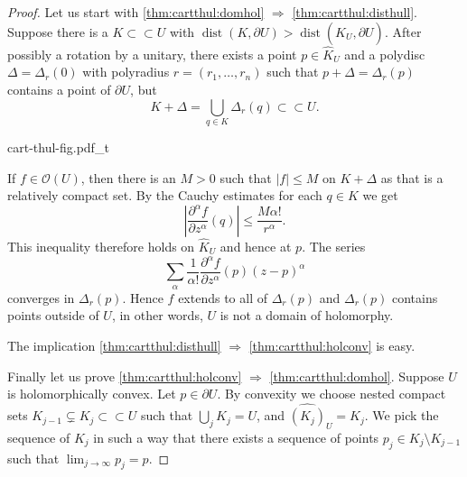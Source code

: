 \documentclass[12pt,openany]{book}
\newcommand{\sabs}[1]{\lvert {#1} \rvert}
\newcommand{\abs}[1]{\left\lvert {#1} \right\rvert}
\newcommand{\sO}{{\mathscr{O}}}
\theoremstyle{plain}
\theoremstyle{remark}
\theoremstyle{definition}
\theoremstyle{exercise}
\theoremstyle{example}
\begin{document}
\begin{proof}
Let us start with \eqref{thm:cartthul:domhol} $\Rightarrow$
\eqref{thm:cartthul:disthull}.  Suppose there is a $K \subset
\subset U$ with $\operatorname{dist}(K,\partial U) > \operatorname{dist}(\widehat{K}_U,\partial U)$.
After possibly a rotation by a unitary,
there exists a point $p \in \widehat{K}_U$ and a polydisc
$\Delta = \Delta_r(0)$ with polyradius $r = (r_1,\ldots,r_n)$ such that
$p + \Delta = \Delta_r(p)$ contains a point of $\partial U$, but
\begin{equation*}
K + \Delta = \bigcup_{q \in K} \Delta_r(q) \subset \subset U.
\end{equation*}

\begin{center}
{cart-thul-fig.pdf_t}
\end{center}

If $f \in \sO(U)$, then there is an $M > 0$ such that $\sabs{f} \leq M$ on
$K + \Delta$ as that is a relatively compact set.  By the Cauchy estimates
for each $q \in K$ we get
\begin{equation*}
\abs{\frac{\partial^\alpha f}{\partial z^\alpha}(q)} \leq \frac{M
\alpha!}{r^\alpha} .
\end{equation*}
This inequality therefore holds on $\widehat{K}_U$ and hence at $p$.
The series
\begin{equation*}
\sum_{\alpha}
\frac{1}{\alpha !}\frac{\partial^\alpha f}{\partial z^\alpha}(p) {(z-p)}^\alpha 
\end{equation*}
converges in $\Delta_r(p)$.  Hence $f$ extends to all of $\Delta_r(p)$ and
$\Delta_r(p)$ contains points outside of $U$, in other words,
$U$ is not a domain of holomorphy.

The implication \eqref{thm:cartthul:disthull} $\Rightarrow$
\eqref{thm:cartthul:holconv} is easy.

Finally let us prove
\eqref{thm:cartthul:holconv} $\Rightarrow$
\eqref{thm:cartthul:domhol}.
Suppose $U$ is holomorphically convex.  Let $p \in \partial U$.
By convexity we choose nested compact sets $K_{j-1} \subsetneq K_j \subset
\subset U$ such that $\bigcup_j K_j = U$, and $\widehat{(K_j)}_U = K_j$.
We pick the sequence of $K_j$ in such a way that 
there exists a 
sequence of points $p_j \in K_j \setminus K_{j-1}$ such that
$\lim_{j\to\infty} p_j = p$.


\end{proof}
\end{document}
